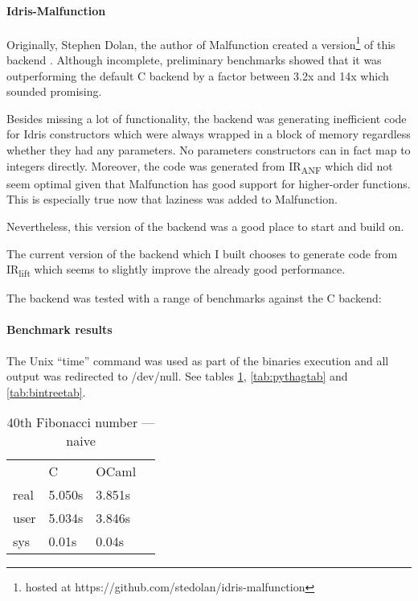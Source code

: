 \documentclass[a4paper,11pt,twocolumn]{article}
\begin{document}
\paragraph{Idris-Malfunction}

Originally, Stephen Dolan, the author of Malfunction created a
version\footnote{hosted at
    https://github.com/stedolan/idris-malfunction}
of this backend \cite{dolan2016malfunctional}.
Although incomplete, preliminary benchmarks showed that it was
outperforming the default C backend by a factor between 3.2x and 14x
which sounded promising.

Besides missing a lot of functionality, the backend was generating
inefficient code for Idris constructors which were always wrapped
in a block of memory regardless whether they had any parameters.
No parameters constructors can in fact map to integers directly.
Moreover, the code was generated from IR\textsubscript{ANF}
which did not seem optimal given that Malfunction has
good support for higher-order functions.
This is especially true now that laziness was added to Malfunction.

Nevertheless, this version of the backend was a good place to start
and build on.

The current version of the backend which I built chooses
to generate code from IR\textsubscript{lift} which seems to
slightly improve the already good performance.

The backend was tested with a range of benchmarks against the
C backend:

\paragraph{Benchmark results}
The Unix ``time'' command was used as part of the binaries execution
and all output was redirected to /dev/null.
See tables \ref{tab:fibtab},
\ref{tab:pythagtab} and
\ref{tab:bintreetab}.

\begin{table}
    \centering
    \caption{40th Fibonacci number --- naive}
    \begin{tabular}{llll}\label{tab:fibtab}
             & C      & OCaml  & \\
        real & 5.050s & 3.851s & \\
        user & 5.034s & 3.846s & \\
        sys  & 0.01s  & 0.04s  &
    \end{tabular}
\end{table}
\end{document}
